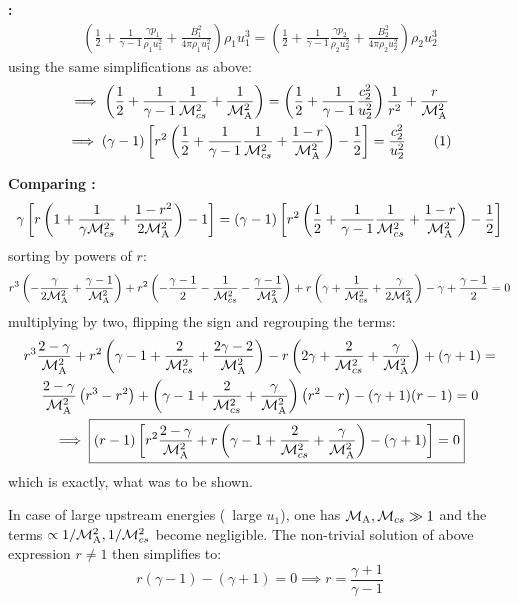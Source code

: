 \textbf{:}
\begin{gather*}
    \left(\frac{1}{2}+\frac{1}{\gamma-1}\frac{\gamma{p_1}}{\rho_1u_1^2}+\frac{B_1^2}{4\pi\rho_1u_1^2}\right)\rho_1u_1^3=
    \left(\frac{1}{2}+\frac{1}{\gamma-1}\frac{\gamma{p_2}}{\rho_2u_2^2}+\frac{B_2^2}{4\pi\rho_2u_2^2}\right)\rho_2u_2^3
\end{gather*}
using the same simplifications as above:
\begin{gather*}
    \implies
    \left(\frac{1}{2}+\frac{1}{\gamma-1}\frac{1}{\Mcsq}+\frac{1}{\MAsq}\right)
    =\left(\frac{1}{2}+\frac{1}{\gamma-1}\frac{c_2^2}{u_2^2}\right)\frac{1}{r^2}+\frac{r}{\MAsq}
    \\ \implies
    (\gamma-1)\left[r^2\left(\frac{1}{2}+\frac{1}{\gamma-1}\frac{1}{\Mcsq}+\frac{1-r}{\MAsq}\right)-\frac{1}{2}\right]=\frac{c_2^2}{u_2^2}
    \numberthis\label{eq:a3.1}
\end{gather*}

\textbf{Comparing :}
\begin{gather*}
    \gamma\left[r\left(1+\frac{1}{\gamma\mathcal{M}_{cs}^2}+\frac{1-r^2}{2\mathcal{M}_{\mathrm{A}}^2}\right)-1\right]=
    (\gamma-1)\left[r^2\left(\frac{1}{2}+\frac{1}{\gamma-1}\frac{1}{\mathcal{M}_{cs}^2}+\frac{1-r}{\mathcal{M}_{\mathrm{A}}^2}\right)-\frac{1}{2}\right]
\end{gather*}
sorting by powers of $r$:
\begin{gather*}
    r^3\left(-\frac{\gamma}{2\mathcal{M}_{\mathrm{A}}^2}+\frac{\gamma-1}{\mathcal{M}_{\mathrm{A}}^2}\right)
    +r^2\left(-\frac{\gamma-1}{2}-\frac{1}{\mathcal{M}_{cs}^2}-\frac{\gamma-1}{\mathcal{M}_{\mathrm{A}}^2}\right)
    +r\left(\gamma+\frac{1}{\mathcal{M}_{cs}^2}+\frac{\gamma}{2\mathcal{M}_{\mathrm{A}}^2}\right)
    -\gamma+\frac{\gamma-1}{2}=0
\end{gather*}
multiplying by two, flipping the sign and regrouping the terms:
\begin{gather*}
    r^3\frac{2-\gamma}{\MAsq}+r^2\left(\gamma-1+\frac{2}{\Mcsq}+\frac{2\gamma-2}{\MAsq}\right)
    -r\left(2\gamma+\frac{2}{\Mcsq}+\frac{\gamma}{\MAsq}\right)+(\gamma+1)=\\
    \frac{2-\gamma}{\MAsq}\left(r^3-r^2\right)
    +\left(\gamma-1+\frac{2}{\Mcsq}+\frac{\gamma}{\MAsq}\right)\left(r^2-r\right)
    -(\gamma+1)(r-1)=0 \\
    \implies\boxed{%
        (r-1)\left[r^2\frac{2-\gamma}{\MAsq}+r\left(\gamma-1+\frac{2}{\Mcsq}+\frac{\gamma}{\MAsq}\right)-(\gamma+1)\right]=0
    }
\end{gather*}
which is exactly, what was to be shown.

In case of large upstream energies (\ie~large $u_1$), one has $\mathcal{M}_{\mathrm{A}},\mathcal{M}_{cs}\gg1$
and the terms $\propto1/\mathcal{M}_{\mathrm{A}}^2,1/\mathcal{M}_{cs}^2$ become negligible. The non-trivial
solution of above expression $r\ne1$ then simplifies to:
\begin{equation}
    r(\gamma-1)-(\gamma+1)=0
    \implies\boxed{r=\frac{\gamma+1}{\gamma-1}}
    \label{eq:r-final}
\end{equation}



